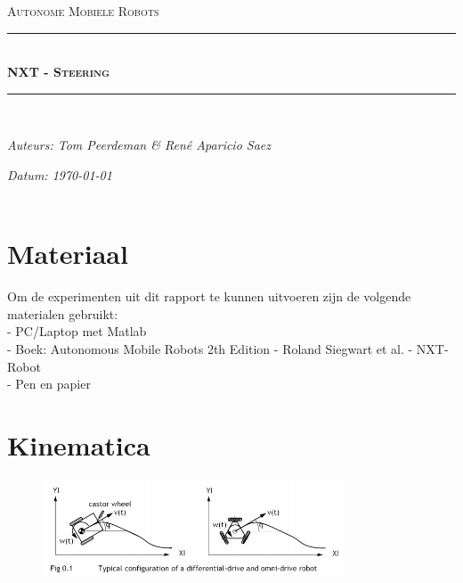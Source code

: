 \documentclass[a4paper]{article}
\newcommand{\HRule}{\rule{\linewidth}{0.5mm}}
\begin{document}
\begin{titlepage}
\begin{center}
\textsc{\Large Autonome Mobiele Robots}\\[0.5cm]
\HRule \\[0,4cm]
\textsc{\huge \bfseries NXT - Steering}
\HRule \\[8cm]
\begin{minipage}{0.4\textwidth}
\begin{flushleft}\large
\emph{Auteurs: Tom Peerdeman \& Ren\'e Aparicio Saez}\\
\end{flushleft}
\end{minipage}
\begin{minipage}{0.4\textwidth}
\begin{flushright}\large
\emph{Datum: \today\\\hspace{1cm}}\\
\end{flushright}
\end{minipage}
\end{center}
\end{titlepage}

\section{Materiaal}
Om de experimenten uit dit rapport te kunnen uitvoeren zijn de volgende materialen gebruikt:\\
- PC/Laptop met Matlab\\
- Boek: Autonomous Mobile Robots 2th Edition - Roland Siegwart et al.
- NXT-Robot\\
- Pen en papier
\section{Kinematica}
\begin{figure}[h]
	\centering
	\includegraphics[width=0.8\textwidth]{imgs/robots.png}
	\label{fig:lineairverband}
\end{figure}
\end{document}
